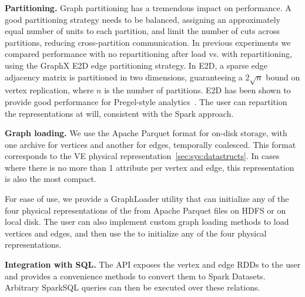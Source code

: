 {\bf Partitioning.}  Graph partitioning has a tremendous impact on
performance.  A good partitioning strategy needs to be balanced,
assigning an approximately equal number of units to each partition,
and limit the number of cuts across partitions, reducing
cross-partition communication.  In previous experiments we compared
performance with no repartitioning after load vs.  with
repartitioning, using the GraphX E2D edge partitioning strategy.  In
E2D, a sparse edge adjacency matrix is partitioned in two dimensions,
guaranteeing a $2 \sqrt{n}$ bound on vertex replication, where $n$ is
the number of partitions. E2D has been shown to provide good
performance for Pregel-style
analytics~\cite{DBLP:conf/osdi/GonzalezXDCFS14,MoffittTempWeb16}.  The
user can repartition the representations at will, consistent with the
Spark approach.

{\bf Graph loading.}  We use the Apache Parquet format for on-disk
storage, with one archive for vertices and another for edges,
temporally coalesced.  This format corresponds to the VE physical
representation~\ref{sec:sys:datastructs}.  In cases where there is no
more than 1 attribute per vertex and edge, this representation is also
the most compact.  

For ease of use, we provide a GraphLoader utility that can initialize
any of the four physical representations of the \tg from Apache
Parquet files on HDFS or on local disk.  The \ql user can also
implement custom graph loading methods to load vertices and edges, and
then use the  to initialize any of the four physical
representations.

{\bf Integration with SQL.}  The \ql API exposes the vertex and edge
RDDs to the user and provides a convenience methods to convert them to
Spark Datasets.  Arbitrary SparkSQL queries can then be executed over
these relations.





